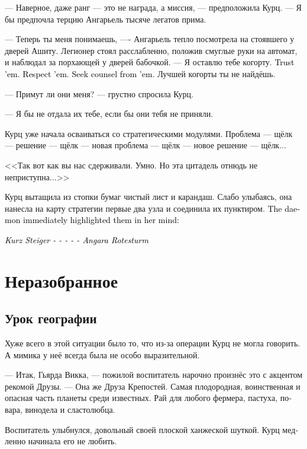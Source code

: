 \documentclass[a4paper,12pt,fleqn]{book}\usepackage{cooltooltips}\usepackage{polyglossia}\setdefaultlanguage[babelshorthands=true]{russian}\setotherlanguage{english}\defaultfontfeatures{Ligatures=TeX,Mapping=tex-text} \usepackage{xcolor}\definecolor{lightgray}{HTML}{bbbbbb}\color{lightgray}\newcommand{\ml}[3]{\textenglish{\textcolor{black}{#3}}}
\begin{document}
--- Наверное, даже ранг --- это не награда, а миссия, --- предположила Курц.
--- Я бы предпочла терцию Ангарьель тысяче легатов прима.

--- Теперь ты меня понимаешь, ---- Ангарьель тепло посмотрела на стоявшего у дверей Ашиту.
Легионер стоял расслабленно, положив смуглые руки на автомат, и наблюдал за порхающей у дверей бабочкой.
--- Я оставлю тебе когорту.
\ml{$0$}
{Доверяй им.}
{Trust 'em.}
\ml{$0$}
{Цени их.}
{Respect 'em.}
\ml{$0$}
{Советуйся с ними.}
{Seek counsel from 'em.}
Лучшей когорты ты не найдёшь.

--- Примут ли они меня? --- грустно спросила Курц.

--- Я бы не отдала их тебе, если бы они тебя не приняли.

Курц уже начала осваиваться со стратегическими модулями.
Проблема --- щёлк --- решение --- щёлк --- новая проблема --- щёлк --- новое решение --- щёлк...

<<Так вот как вы нас сдерживали.
Умно.
Но эта цитадель отнюдь не неприступна...>>

Курц вытащила из стопки бумаг чистый лист и карандаш.
Слабо улыбаясь, она нанесла на карту стратегии первые два узла и соединила их пунктиром.
\ml{$0$}
{Демон тут же подсветил их в её сознании:}
{The daemon immediately highlighted them in her mind:}

\ml{$0$}
{<<Курц Штайгер - - - - - Ангара Ротештурм>>}
{\textit{Kurz Steiger - - - - - Angara Rotesturm}}

\chapter{Неразобранное}

\section{Урок географии}

Хуже всего в этой ситуации было то, что из-за операции Курц не могла говорить.
А мимика у неё всегда была не особо выразительной.

--- Итак, Гьярда Викка, --- пожилой воспитатель нарочно произнёс это с акцентом рекомой Друзы.
--- Она же Друза Крепостей.
Самая плодородная, воинственная и опасная часть планеты среди известных.
Рай для любого фермера, пастуха, повара, винодела и сластолюбца.

Воспитатель улыбнулся, довольный своей плоской ханжеской шуткой.
Курц медленно начинала его не любить.
\end{document}
